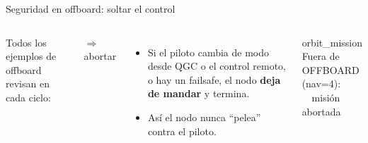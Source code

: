 \begin{frame}{Seguridad en offboard: soltar el control}
  \begin{columns}[c]
    \small
    Todos los ejemplos de offboard revisan en cada ciclo:
    \begin{center}
       $\Rightarrow$ abortar
    \end{center}
    \begin{itemize}
      \item Si el piloto cambia de modo desde QGC o el control remoto, o hay un failsafe, el nodo
        \textbf{deja de mandar} y termina.
      \item Así el nodo nunca ``pelea'' contra el piloto.
    \end{itemize}
    \begin{terminal}{orbit\_mission}
Fuera de OFFBOARD (nav=4):\\
\ \ misión abortada
    \end{terminal}
  \end{columns}
\end{frame}

